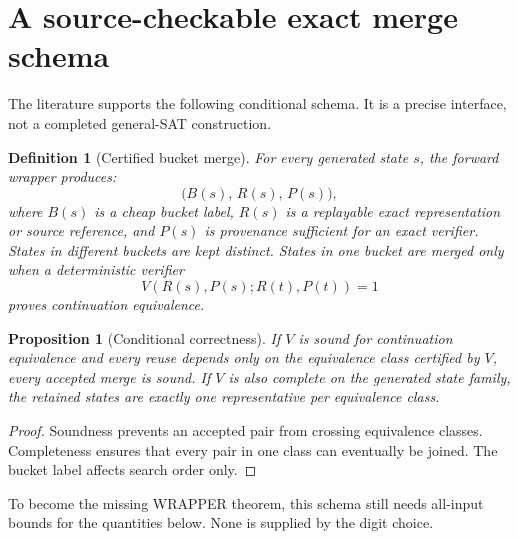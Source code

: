 \documentclass[11pt]{article}
\newtheorem{proposition}[theorem]{Proposition}
\newtheorem{definition}[theorem]{Definition}
\begin{document}
\section{A source-checkable exact merge schema}

The literature supports the following conditional schema.  It is a precise
interface, not a completed general-SAT construction.

\begin{definition}[Certified bucket merge]
For every generated state $s$, the forward wrapper produces:
\[
  \bigl(B(s),\,R(s),\,P(s)\bigr),
\]
where $B(s)$ is a cheap bucket label, $R(s)$ is a replayable exact
representation or source reference, and $P(s)$ is provenance sufficient for
an exact verifier.  States in different buckets are kept distinct.  States
in one bucket are merged only when a deterministic verifier
\[
 V(R(s),P(s);R(t),P(t))=1
\]
proves continuation equivalence.
\end{definition}

\begin{proposition}[Conditional correctness]
If $V$ is sound for continuation equivalence and every reuse depends only on
the equivalence class certified by $V$, every accepted merge is sound.  If
$V$ is also complete on the generated state family, the retained states are
exactly one representative per equivalence class.
\end{proposition}

\begin{proof}
Soundness prevents an accepted pair from crossing equivalence classes.
Completeness ensures that every pair in one class can eventually be joined.
The bucket label affects search order only.
\end{proof}

To become the missing WRAPPER theorem, this schema still needs all-input
bounds for the quantities below.  None is supplied by the digit choice.
\end{document}
